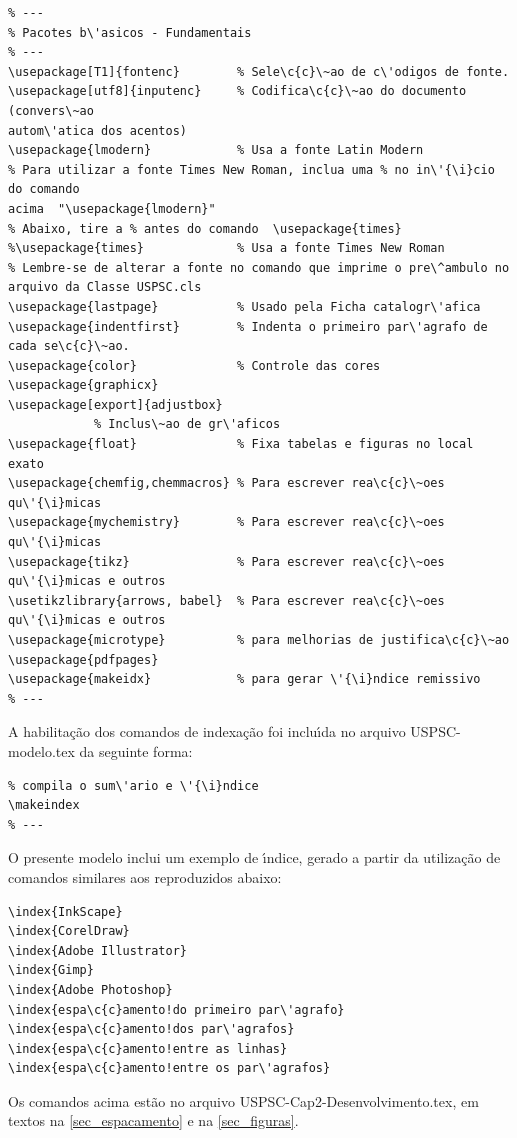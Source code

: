 \begin{verbatim}
% ---
% Pacotes b\'asicos - Fundamentais 
% ---
\usepackage[T1]{fontenc}		% Sele\c{c}\~ao de c\'odigos de fonte.
\usepackage[utf8]{inputenc}		% Codifica\c{c}\~ao do documento (convers\~ao 
autom\'atica dos acentos)
\usepackage{lmodern}			% Usa a fonte Latin Modern
% Para utilizar a fonte Times New Roman, inclua uma % no in\'{\i}cio do comando 
acima  "\usepackage{lmodern}"
% Abaixo, tire a % antes do comando  \usepackage{times}
%\usepackage{times}		    	% Usa a fonte Times New Roman	
% Lembre-se de alterar a fonte no comando que imprime o pre\^ambulo no 
arquivo da Classe USPSC.cls				
\usepackage{lastpage}			% Usado pela Ficha catalogr\'afica
\usepackage{indentfirst}		% Indenta o primeiro par\'agrafo de cada se\c{c}\~ao.
\usepackage{color}				% Controle das cores
\usepackage{graphicx}
\usepackage[export]{adjustbox}
			% Inclus\~ao de gr\'aficos
\usepackage{float} 				% Fixa tabelas e figuras no local exato
\usepackage{chemfig,chemmacros} % Para escrever rea\c{c}\~oes qu\'{\i}micas
\usepackage{mychemistry}        % Para escrever rea\c{c}\~oes qu\'{\i}micas
\usepackage{tikz}				% Para escrever rea\c{c}\~oes qu\'{\i}micas e outros
\usetikzlibrary{arrows, babel}	% Para escrever rea\c{c}\~oes qu\'{\i}micas e outros
\usepackage{microtype} 			% para melhorias de justifica\c{c}\~ao
\usepackage{pdfpages}
\usepackage{makeidx}            % para gerar \'{\i}ndice remissivo
% ---
\end{verbatim}

A habilita\c{c}\~ao dos comandos de indexa\c{c}\~ao foi inclu\'{\i}da no arquivo USPSC-modelo.tex da seguinte forma:


\begin{verbatim}
% compila o sum\'ario e \'{\i}ndice
\makeindex
% ---
\end{verbatim}

O presente modelo inclui um exemplo de \'{\i}ndice, gerado a partir da utiliza\c{c}\~ao de comandos similares aos reproduzidos abaixo:

\begin{verbatim}
\index{InkScape}
\index{CorelDraw}
\index{Adobe Illustrator}
\index{Gimp}
\index{Adobe Photoshop}
\index{espa\c{c}amento!do primeiro par\'agrafo}
\index{espa\c{c}amento!dos par\'agrafos}
\index{espa\c{c}amento!entre as linhas}
\index{espa\c{c}amento!entre os par\'agrafos}
\end{verbatim}

Os comandos acima est\~ao no arquivo USPSC-Cap2-Desenvolvimento.tex, em textos na  \autoref{sec_espacamento}  e na  \autoref{sec_figuras}.

